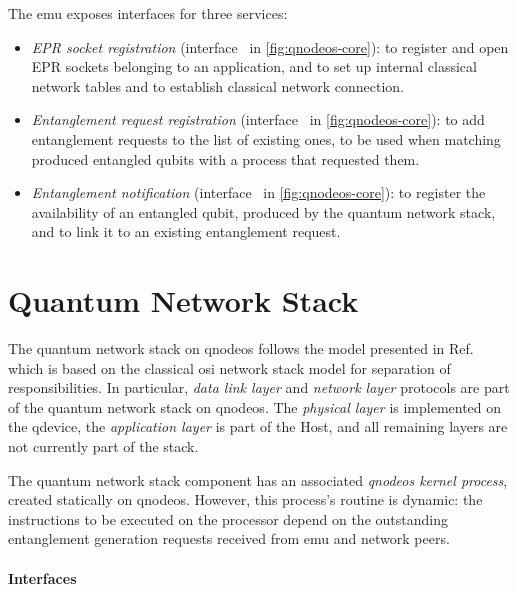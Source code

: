 The \acrshort{emu} exposes interfaces for three services:
\begin{itemize}
    \item \emph{EPR socket registration} (interface~ in \cref{fig:qnodeos-core}): to
          register and open EPR sockets belonging to an application, and to set up internal
          classical network tables and to establish classical network connection.
    \item \emph{Entanglement request registration} (interface~ in
          \cref{fig:qnodeos-core}): to add entanglement requests to the list of existing ones, to be
          used when matching produced entangled qubits with a process that requested them.
    \item \emph{Entanglement notification} (interface~ in \cref{fig:qnodeos-core}): to
          register the availability of an entangled qubit, produced by the quantum network stack,
          and to link it to an existing entanglement request.
\end{itemize}

\section{Quantum Network Stack}

The quantum network stack on \acrshort{qnodeos} follows the model presented in
Ref.~\cite{dahlberg_2019_egp} which is based on the classical \acrshort{osi} network stack model for
separation of responsibilities. In particular, \emph{data link layer} and \emph{network layer}
protocols are part of the quantum network stack on \acrshort{qnodeos}. The \emph{physical layer} is
implemented on the \acrshort{qdevice}, the \emph{application layer} is part of the Host, and all
remaining layers are not currently part of the stack.

The quantum network stack component has an associated \emph{\acrshort{qnodeos} kernel process},
created statically on \acrshort{qnodeos}. However, this process's routine is dynamic: the
instructions to be executed on the processor depend on the outstanding entanglement generation
requests received from \acrshort{emu} and network peers.

\paragraph{Interfaces}

